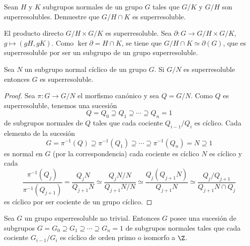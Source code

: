 \begin{exercise}
	Sean $H$ y $K$ subgrupos normales de un grupo $G$ tales que $G/K$ y $G/H$
	son superresolubles. Demuestre que $G/H\cap K$ es superresoluble.
\end{exercise}

\begin{svgraybox}
	El producto directo $G/H\times G/K$ es superresoluble. Sea $\partial\colon
	G\to G/H\times G/K$, $g\mapsto (gH,gK)$.  Como $\ker\partial=H\cap K$, se
	tiene que $G/H\cap K\simeq\partial(G)$, que es superresoluble por ser un
	subgrupo de un grupo superresoluble.
\end{svgraybox}

\begin{proposition}
	\label{proposition:Nciclico}
	Sea $N$ un subgrupo normal cíclico de un grupo $G$. Si $G/N$ es
	superresoluble entonces $G$ es superresoluble.
\end{proposition}

\begin{proof}
	Sea $\pi\colon G\to G/N$ el morfismo canónico y sea $Q=G/N$. Como $Q$ es
	superresoluble, tenemos una sucesión
	\[
		Q=Q_0\supseteq Q_1\supseteq \cdots\supseteq Q_n=1
	\]
	de subgrupos normales de $Q$ tales que cada cociente $Q_{i-1}/Q_i$ es
	cíclico. Cada elemento de la sucesión
	\[
	G=\pi^{-1}(Q)\supseteq\pi^{-1}(Q_1)\supseteq\cdots\supseteq \pi^{-1}(Q_n)=N\supseteq 1
	\]
	es normal en $G$ (por la correspondencia) cada cociente es cíclico $N$ es cíclico y cada 
	\[
	\frac{\pi^{-1}(Q_j)}{\pi^{-1}(Q_{j+1})}
		=\frac{Q_jN}{Q_{j+1}N}
		\simeq\frac{Q_jN/N}{Q_{j+1}N/N}
		\simeq\frac{Q_j(Q_{j+1}N)}{Q_{j+1}N}
		\simeq\frac{Q_j/Q_{j+1}}{Q_{j+1}N\cap Q_j}
	\]
	es cíclico por ser cociente de un grupo cíclico.
\end{proof}

\begin{theorem}
	\label{theorem:ZorCp}
	Sea $G$ un grupo superresoluble no trivial. Entonces $G$ posee una sucesión
	de subgrupos $G=G_0\supseteq G_1\supseteq\cdots\supseteq G_n=1$ de
	subgrupos normales tales que cada cociente $G_{i-1}/G_i$ es cíclico de
	orden primo o isomorfo a $\Z$.
\end{theorem}

